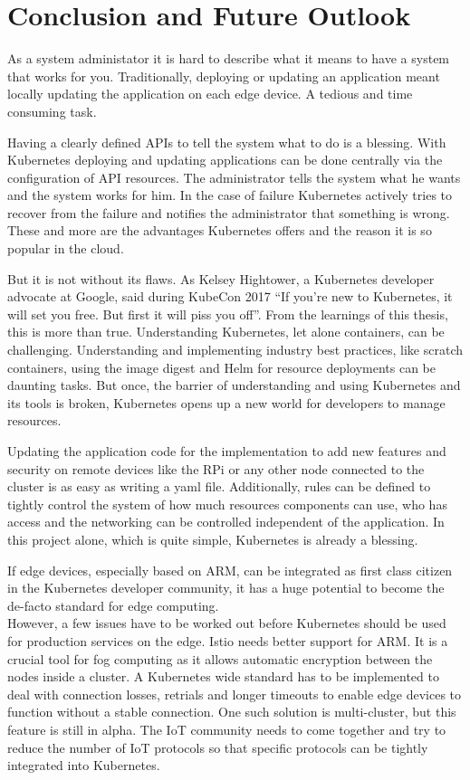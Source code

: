 \clearpage
\section{Conclusion and Future Outlook}
As a system administator it is hard to describe what it means to have a system that works for you. Traditionally, deploying or updating an application meant locally updating the application on each edge device. A tedious and time consuming task.

Having a clearly defined APIs to tell the system what to do is a blessing. With Kubernetes deploying and updating applications can be done centrally via the configuration of API resources. The administrator tells the system what he wants and the system works for him. In the case of failure Kubernetes actively tries to recover from the failure and notifies the administrator that something is wrong. These and more are the advantages Kubernetes offers and the reason it is so popular in the cloud.

But it is not without its flaws. As Kelsey Hightower, a Kubernetes developer advocate at Google, said during KubeCon 2017 ``If you’re new to Kubernetes, it will set you free. But first it will piss you off''\cite{KubernetesPissYouOff:online}. From the learnings of this thesis, this is more than true. Understanding Kubernetes, let alone containers, can be challenging. Understanding and implementing industry best practices, like scratch containers, using the image digest and Helm for resource deployments can be daunting tasks. But once, the barrier of understanding and using Kubernetes and its tools is broken, Kubernetes opens up a new world for developers to manage resources.

Updating the application code for the implementation to add new features and security on remote devices like the RPi or any other node connected to the cluster is as easy as writing a yaml file. Additionally, rules can be defined to tightly control the system of how much resources components can use, who has access and the networking can be controlled independent of the application. In this project alone, which is quite simple, Kubernetes is already a blessing.  


If edge devices, especially based on ARM, can be integrated as first class citizen in the Kubernetes developer community, it has a huge potential to become the de-facto standard for edge computing.\\[5mm]

However, a few issues have to be worked out before Kubernetes should be used for production services on the edge. Istio needs better support for ARM. It is a crucial tool for fog computing as it allows automatic encryption between the nodes inside a cluster. A Kubernetes wide standard has to be implemented to deal with connection losses, retrials and longer timeouts to enable edge devices to function without a stable connection. One such solution is multi-cluster, but this feature is still in alpha. The IoT community needs to come together and try to reduce the number of IoT protocols so that specific protocols can be tightly integrated into Kubernetes.  

